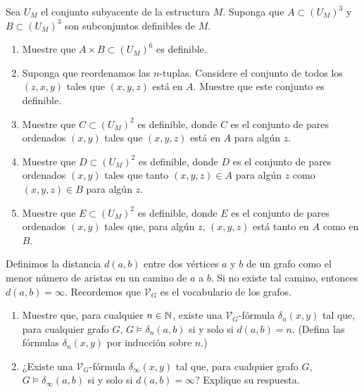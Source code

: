 \documentclass[12pt,a4paper]{book}
\newcommand{\VV}{\mathcal{V}}
\begin{document}
    \begin{ejercicio}
        Sea $U_{M}$ el conjunto subyacente de la estructura $M$. Suponga que $A\subset(U_{M})^{3}$ y $B\subset(U_{M})^{3}$
        son subconjuntos definibles de $M$.
        \begin{enumerate}[label=(\alph*)]
            \item Muestre que $A\times B\subset(U_{M})^{6}$ es definible.
            \item Suponga que reordenamos las $n$-tuplas. Considere el conjunto de todos los $(z,x,y)$ tales que $(x,y,z)$
            está en $A$. Muestre que este conjunto es definible.
            \item Muestre que $C\subset(U_{M})^{2}$ es definible, donde $C$ es el conjunto de pares ordenados $(x,y)$
            tales que $(x,y,z)$ está en $A$ para algún $z$.
            \item Muestre que $D\subset(U_{M})^{2}$ es definible, donde $D$ es el conjunto de pares ordenados $(x,y)$
            tales que tanto $(x,y,z)\in A$ para algún $z$ como $(x,y,z)\in B$ para algún $z$.
            \item Muestre que $E\subset(U_{M})^{2}$ es definible, donde $E$ es el conjunto de pares ordenados $(x,y)$
            tales que, para algún $z$, $(x,y,z)$ está tanto en $A$ como en $B$.
        \end{enumerate}
    \end{ejercicio}

    \begin{ejercicio}
        Definimos la distancia $d(a,b)$ entre dos vértices $a$ y $b$ de un grafo como el menor número de aristas en un
        camino de $a$ a $b$. Si no existe tal camino, entonces $d(a,b)=\infty$. Recordemos que $\VV_{G}$ es el vocabulario
        de los grafos.
        \begin{enumerate}[label=(\alph*)]
            \item Muestre que, para cualquier $n\in\mathbb{N}$, existe una $\VV_{G}$-fórmula $\delta_{n}(x,y)$ tal que, para
            cualquier grafo $G$, $G\models\delta_{n}(a,b)$ si y solo si $d(a,b)=n$. (Defina las fórmulas $\delta_{n}(x,y)$
            por inducción sobre $n$.)
            \item ¿Existe una $\VV_{G}$-fórmula $\delta_{\infty}(x,y)$ tal que, para cualquier grafo $G$,
            $G\models\delta_{\infty}(a,b)$ si y solo si $d(a,b)=\infty$? Explique su respuesta.
        \end{enumerate}
    \end{ejercicio}
\end{document}
